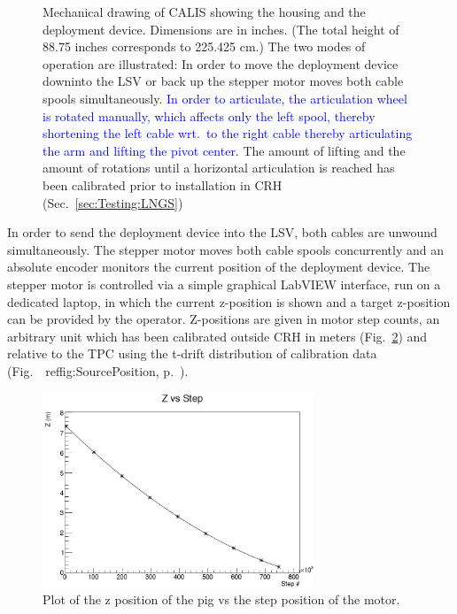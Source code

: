 \begin{figure}[htbp]
 \caption{%
Mechanical drawing of CALIS showing the housing and the deployment device. Dimensions are in inches. (The total height of 88.75 inches corresponds to 225.425 cm.) The two modes of operation are illustrated: In order to move the deployment device downinto the LSV or back up the stepper motor moves both cable spools simultaneously. \textcolor{blue}{In order to articulate, the articulation wheel is rotated manually, which affects only the left spool, thereby shortening the left cable wrt.~to the right cable thereby articulating the arm and lifting the pivot center.} The amount of lifting and the amount of rotations until a horizontal articulation is reached has been calibrated prior to installation in CRH (Sec.~\ref{sec:Testing:LNGS})\label{fig:CALISDimensions}\label{fig:CALISMechanism}\label{fig:gearDrawing}
}
\end{figure}

In order to send the deployment device into the LSV, both cables are unwound simultaneously. The stepper motor moves both cable spools concurrently and an absolute encoder monitors the current position of the deployment device. The stepper motor is controlled via a simple graphical LabVIEW interface, run on a dedicated laptop, in which the current z-position is shown and a target z-position can be provided by the operator. Z-positions are given in motor step counts, an arbitrary unit which has been calibrated outside CRH in meters (Fig.~\ref{fig:z_test}) and relative to the TPC using the t-drift distribution of calibration data (Fig.~\ ref{fig:SourcePosition}, p.~\pageref{fig:SourcePosition}).

\begin{figure}[htbp]
 \centering
 \includegraphics[width=3.2in]{Figures/Z_positioning_test}
 \caption{Plot of the z position of the pig vs the step position of the motor.}
 \label{fig:z_test}
\end{figure}

